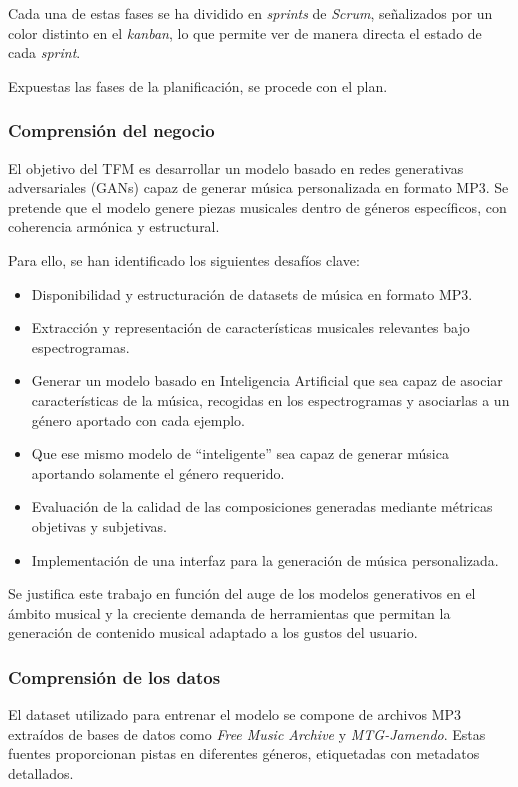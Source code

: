 
Cada una de estas fases se ha dividido en \emph{sprints} de \emph{Scrum}, señalizados por un color distinto en el \emph{kanban}, lo que permite ver de manera directa el estado de cada \emph{sprint}.

Expuestas las fases de la planificación, se procede con el plan.

\subsubsection{Comprensión del negocio}

El objetivo del TFM es desarrollar un modelo basado en redes generativas adversariales (GANs) capaz de generar música personalizada en formato MP3. Se pretende que el modelo genere piezas musicales dentro de géneros específicos, con coherencia armónica y estructural.

Para ello, se han identificado los siguientes desafíos clave:
\begin{itemize}
    \item Disponibilidad y estructuración de datasets de música en formato MP3.
    \item Extracción y representación de características musicales relevantes bajo espectrogramas.
    \item Generar un modelo basado en Inteligencia Artificial que sea capaz de asociar características de la música, recogidas en los espectrogramas y asociarlas a un género aportado con cada ejemplo.
    \item Que ese mismo modelo de ``inteligente'' sea capaz de generar música aportando solamente el género requerido.
    \item Evaluación de la calidad de las composiciones generadas mediante métricas objetivas y subjetivas.
    \item Implementación de una interfaz para la generación de música personalizada.
\end{itemize}

Se justifica este trabajo en función del auge de los modelos generativos en el ámbito musical y la creciente demanda de herramientas que permitan la generación de contenido musical adaptado a los gustos del usuario.

\subsubsection{Comprensión de los datos}

El dataset utilizado para entrenar el modelo se compone de archivos MP3 extraídos de bases de datos como \textit{Free Music Archive} y \textit{MTG-Jamendo}. Estas fuentes proporcionan pistas en diferentes géneros, etiquetadas con metadatos detallados.

